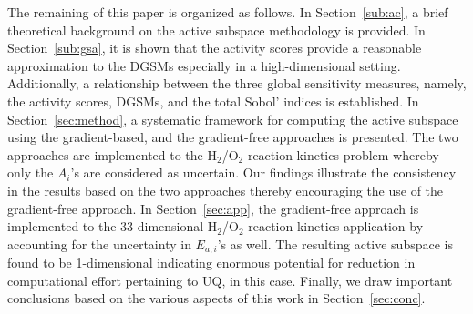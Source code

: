  The remaining of this paper is organized as follows. In Section~\ref{sub:ac}, a brief theoretical background on
 the active subspace methodology is provided. In Section~\ref{sub:gsa}, it is shown that the activity
 scores provide a reasonable approximation to the DGSMs especially in a high-dimensional setting. 
 Additionally, a relationship between the three global sensitivity measures, namely, the activity scores,
 DGSMs, and the total Sobol' indices is established. In Section~\ref{sec:method}, a systematic framework
 for computing the active subspace using the gradient-based, and the gradient-free approaches is presented. 
The two approaches are implemented to the H$_2$/O$_2$ reaction kinetics problem whereby only
the $A_i$'s are considered as uncertain. Our findings illustrate the consistency in the results based on
the two approaches thereby encouraging the use of the gradient-free approach. In Section~\ref{sec:app},
the gradient-free approach is implemented to the 33-dimensional
H$_2$/O$_2$ reaction kinetics application by accounting for the uncertainty in $E_{a,i}$'s as well. The
resulting active subspace is found to be 1-dimensional indicating enormous potential for reduction in
computational effort pertaining to UQ, in this case. 
Finally, we draw important conclusions based on the various aspects of this work in Section~\ref{sec:conc}.










 




